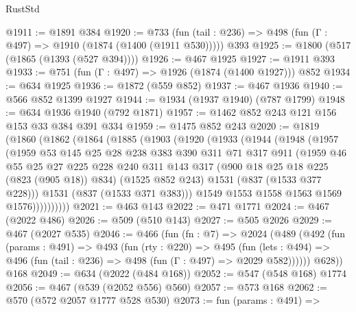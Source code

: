 \begin{lexlean}{RustStd}
\begin{coremodule}
@1911 := @1891 @384
@1920 := @733
    (fun (tail : @236) => @498 (fun (Γ : @497) => @1910 (@1874 (@1400 (@1911 @530)))))
    @393
@1925 := @1800 (@517 (@1865 (@1393 (@527 @394))))
@1926 := @467 @1925
@1927 := @1911 @393
@1933 := @751 (fun (Γ : @497) => @1926 (@1874 (@1400 @1927))) @852
@1934 := @634 @1925
@1936 := @1872 (@559 @852)
@1937 := @467 @1936
@1940 := @566 @852 @1399 @1927
@1944 := @1934 (@1937 @1940) (@787 @1799)
@1948 := @634 @1936 @1940 (@792 @1871)
@1957 := @1462 @852 @243 @121 @156 @153 @33 @384 @391 @334
@1959 := @1475 @852 @243
@2020 := @1819
    (@1860
      (@1862
        (@1864
          (@1885
            (@1903
              (@1920
                (@1933
                  (@1944
                    (@1948
                      (@1957
                        (@1959
                          @53
                          @145
                          @25
                          @28
                          @238
                          @383
                          @390
                          @311
                          @71
                          @317
                          @911
                          (@1959
                            @46
                            @55
                            @25
                            @27
                            @225
                            @228
                            @240
                            @311
                            @143
                            @317
                            (@900 @18 @25 @18 @225 (@823 (@905 @18)) @834)
                            (@1525 @852 @243)
                            @1531
                            (@837 (@1533 @377 @228)))
                          @1531
                          (@837 (@1533 @371 @383)))
                        @1549
                        @1553
                        @1558
                        @1563
                        @1569
                        @1576))))))))))
@2021 := @463 @143
@2022 := @471 @1771
@2024 := @467 (@2022 @486)
@2026 := @509 (@510 @143)
@2027 := @505 @2026
@2029 := @467 (@2027 @535)
@2046 := @466
    (fun (fn : @7) =>
    @2024
      (@489
        (@492
          (fun (params : @491) =>
          @493
            (fun (rty : @220) =>
            @495
              (fun (lets : @494) =>
              @496 (fun (tail : @236) => @498 (fun (Γ : @497) => @2029 @582))))))
        @628))
    @168
@2049 := @634 (@2022 (@484 @168))
@2052 := @547 (@548 @168) @1774
@2056 := @467 (@539 (@2052 @556) @560)
@2057 := @573 @168
@2062 := @570 (@572 @2057 @1777 @528 @530)
@2073 := fun (params : @491) =>

\end{coremodule}
\end{lexlean}
